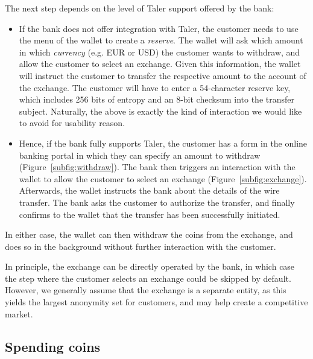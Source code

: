 \documentclass{llncs}
\begin{document}
The next step depends on the level of Taler support offered by the bank:
\begin{itemize}
\item If the bank does not offer integration with Taler, the
  customer needs to use the menu of the wallet to create a {\em reserve}.
  The wallet will ask which amount in which {\em currency} (e.g. EUR
  or USD) the customer wants to withdraw, and allow the customer to
  select an exchange.  Given this information, the wallet will
  instruct the customer to transfer the respective amount to the
  account of the exchange.  The customer will have to enter a
  54-character reserve key, which includes 256 bits of entropy and an
  8-bit checksum into the transfer subject.  Naturally, the above is
  exactly the kind of interaction we would like to avoid for
  usability reason.
\item Hence, if the bank fully supports Taler, the
  customer has a form in the online banking portal in which they can specify
  an amount to withdraw (Figure~\ref{subfig:withdraw}).
  The bank then triggers an interaction with
  the wallet to allow the customer to select an exchange
  (Figure~\ref{subfig:exchange}).  Afterwards,
  the wallet instructs the bank about the details of the wire
  transfer.  The bank asks the customer to authorize the transfer, and
  finally confirms to the wallet that the transfer has been
  successfully initiated.
\end{itemize}

In either case, the wallet can then withdraw the coins from the
exchange, and does so in the background without further interaction
with the customer.

In principle, the exchange can be directly operated by the bank, in
which case the step where the customer selects an exchange could be
skipped by default.  However, we generally assume that the exchange is
a separate entity, as this yields the largest anonymity set for
customers, and may help create a competitive market.

\subsection{Spending coins}
\end{document}
